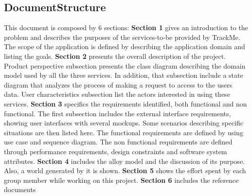 \subsection{DocumentStructure}
This document is composed by 6 sections:
\bigbreak
\noindent
\textbf{Section 1} gives an introduction to the problem and describes the purposes of the services-to-be provided by TrackMe. The scope of the application is defined by describing the application domain and listing the goals.
\bigbreak
\noindent
\textbf{Section 2} presents the overall description of the project. Product perspective subsection presents the class diagram describing the domain model used by all the three services. In addition, that subsection include a state diagram that analyzes the process of making a request to access to the users data. User characteristics subsection list the actors interested in using these services.
\bigbreak
\noindent
\textbf{Section 3} specifics the requirements identified, both functional and non functional. The first subsection includes the external interface requirements, showing user interfaces with several mockups. Some scenarios describing specific situations are then listed here. The functional requirements are defined by using use case and sequence diagram. The non functional requirements are defined through performance requirements, design constraints and software system attributes.
\bigbreak
\noindent
\textbf{Section 4} includes the alloy model and the discussion of its purpose. Also, a world generated by it is shown.
\bigbreak
\noindent
\textbf{Section 5} shows the effort spent by each group member while working on this project.
\bigbreak
\noindent
\textbf {Section 6} includes the reference documents
\clearpage
